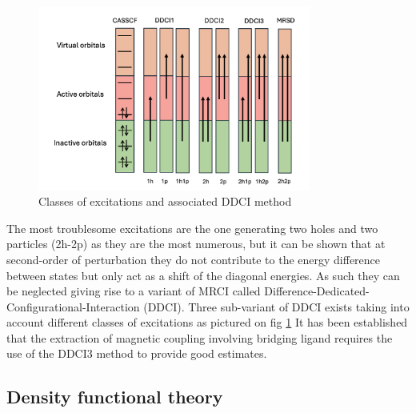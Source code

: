 \documentclass[10pt]{report}
\numberwithin{equation}{section}
\begin{document}
\begin{figure}
    \centering
    \includegraphics[width=0.8\textwidth]{Images/DDCI.png}
    \caption{Classes of excitations and associated DDCI method}
    \label{DDCI}
\end{figure}
The most troublesome excitations are the one generating two holes and two particles (2h-2p) as they are the most numerous, but it can be shown that at second-order of perturbation they do not contribute to the energy difference between states but only act as a shift of the diagonal energies.
As such they can be neglected giving rise to a variant of MRCI called Difference-Dedicated-Configurational-Interaction (DDCI). 
Three sub-variant of DDCI exists taking into account different classes of excitations as pictured on fig \ref{DDCI}
It has been established that the extraction of magnetic coupling involving bridging ligand requires the use of the DDCI3 method to provide good estimates.



\subsection{Density functional theory}
\end{document}
